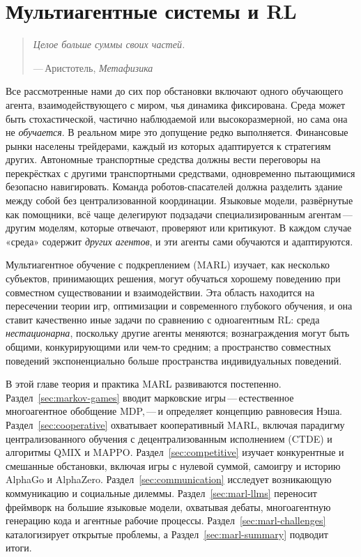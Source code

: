 
\chapter{Мультиагентные системы и RL}
\label{ch:agents}

\begin{quote}
\itshape
Целое больше суммы своих частей.
\par\medskip
\upshape\raggedleft
---\,Аристотель, \textit{Метафизика}
\end{quote}

\bigskip

Все рассмотренные нами до сих пор обстановки включают одного обучающего агента, взаимодействующего
с миром, чья динамика фиксирована. Среда может быть
стохастической, частично наблюдаемой или высокоразмерной, но сама она не
\emph{обучается}. В реальном мире это допущение редко выполняется.
Финансовые рынки населены трейдерами, каждый из которых адаптируется к
стратегиям других. Автономные транспортные средства должны вести переговоры на
перекрёстках с другими транспортными средствами, одновременно пытающимися безопасно
навигировать. Команда роботов-спасателей должна разделить здание между
собой без централизованной координации. Языковые модели, развёрнутые как
помощники, всё чаще делегируют подзадачи специализированным
агентам\,---\,другим моделям, которые отвечают, проверяют или критикуют. В каждом
случае «среда» содержит \emph{других агентов}, и эти агенты
сами обучаются и адаптируются.

Мультиагентное обучение с подкреплением (MARL)
изучает, как несколько субъектов, принимающих решения, могут обучаться хорошему
поведению при совместном существовании и взаимодействии. Эта область находится на
пересечении теории игр, оптимизации и современного глубокого обучения,
и она ставит качественно иные задачи по сравнению с
одноагентным RL: среда \emph{нестационарна}, поскольку
другие агенты меняются; вознаграждения могут быть общими, конкурирующими или
чем-то средним; а пространство совместных поведений экспоненциально больше пространства
индивидуальных поведений.

В этой главе теория и практика MARL развиваются постепенно.
Раздел~\ref{sec:markov-games} вводит марковские игры\,---\,естественное
многоагентное обобщение MDP,\,---\,и определяет концепцию
равновесия Нэша. Раздел~\ref{sec:cooperative}
охватывает кооперативный MARL, включая парадигму централизованного обучения
с децентрализованным исполнением (CTDE) и алгоритмы QMIX и MAPPO.
Раздел~\ref{sec:competitive} изучает конкурентные и
смешанные обстановки, включая игры с нулевой суммой, самоигру и историю
AlphaGo и AlphaZero. Раздел~\ref{sec:communication} исследует
возникающую коммуникацию и социальные дилеммы.
Раздел~\ref{sec:marl-llms} переносит фреймворк на большие языковые
модели, охватывая дебаты, многоагентную генерацию кода и агентные
рабочие процессы. Раздел~\ref{sec:marl-challenges} каталогизирует открытые
проблемы, а Раздел~\ref{sec:marl-summary} подводит итоги.

